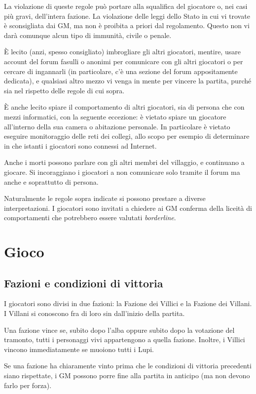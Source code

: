 \documentclass[a4paper,10pt]{article}
\begin{document}
La violazione di queste regole può portare alla squalifica del giocatore o, nei casi più gravi, dell'intera fazione. La violazione delle leggi dello Stato in cui vi trovate è sconsigliata dai GM, ma non è proibita a priori dal regolamento. Questo non vi darà comunque alcun tipo di immunità, civile o penale.

È lecito (anzi, spesso consigliato) imbrogliare gli altri giocatori, mentire, usare account del forum fasulli o anonimi per comunicare con gli altri giocatori o per cercare di ingannarli (in particolare, c'è una sezione del forum appositamente dedicata), e qualsiasi altro mezzo vi venga in mente per vincere la partita, purché sia nel rispetto delle regole di cui sopra.

È anche lecito spiare il comportamento di altri giocatori, sia di persona che con mezzi informatici, con la seguente eccezione: è vietato spiare un giocatore all'interno della sua camera o abitazione personale. In particolare è vietato eseguire monitoraggio delle reti dei collegi, allo scopo per esempio di determinare in che istanti i giocatori sono connessi ad Internet.

Anche i morti possono parlare con gli altri membri del villaggio, e continuano a giocare. Si incoraggiano i giocatori a non comunicare solo tramite il forum ma anche e soprattutto di persona.

Naturalmente le regole sopra indicate si possono prestare a diverse interpretazioni. I giocatori sono invitati a chiedere ai GM conferma della liceità di comportamenti che potrebbero essere valutati \emph{borderline}.
\pagebreak

\section{Gioco}

\subsection{Fazioni e condizioni di vittoria}

I giocatori sono divisi in due fazioni: la Fazione dei Villici e la Fazione dei Villani. I Villani si conoscono fra di loro sin dall'inizio della partita.

Una fazione vince se, subito dopo l'alba oppure subito dopo la votazione del tramonto, tutti i personaggi vivi appartengono a quella fazione. Inoltre, i Villici vincono immediatamente se muoiono tutti i Lupi.

Se una fazione ha chiaramente vinto prima che le condizioni di vittoria precedenti siano rispettate, i GM possono porre fine alla partita in anticipo (ma non devono farlo per forza).
\end{document}
